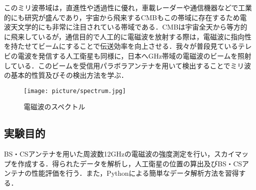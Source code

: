 \documentclass[a4j,10pt,oneside,openany]{jsbook}
\begin{document}
{このミリ波帯域は，直進性や透過性に優れ，車載レーダーや通信機器などで工業的にも研究が盛んであり，宇宙から飛来するCMBもこの帯域に存在するため電波天文学的にも非常に注目されている帯域である．CMBは宇宙全天から等方的に飛来しているが，通信目的で人工的に電磁波を放射する際は，電磁波に指向性を持たせてビームにすることで伝送効率を向上させる．我々が普段見ているテレビの電波を発信する人工衛星も同様に，日本へGHz帯域の電磁波のビームを照射している．このビームを受信用パラボラアンテナを用いて検出することでミリ波の基本的性質及びその検出方法を学ぶ．

\begin{figure}[htbp]
  \begin{center}
    \texttt{[image: picture/spectrum.jpg]}
    \caption{電磁波のスペクトル\cite{pic5}}
    \label{fig:spectrum}
  \end{center}
\end{figure}

\subsection{実験目的}
BS・CSアンテナを用いた周波数12GHzの電磁波の強度測定を行い，スカイマップを作成する．得られたデータを解析し，人工衛星の位置の算出及びBS・CSアンテナの性能評価を行う．また，Pythonによる簡単なデータ解析方法を習得する．

}
\end{document}
